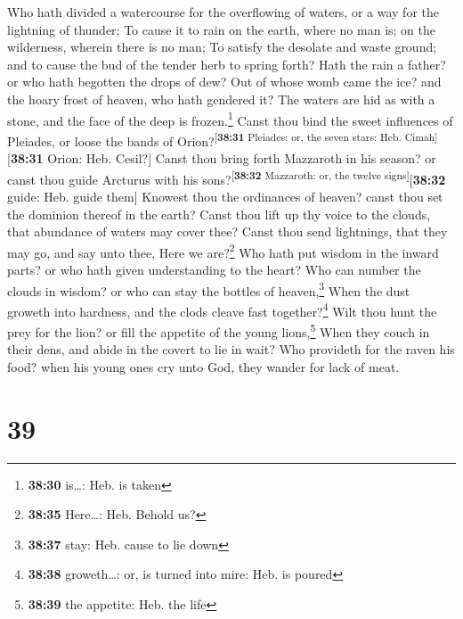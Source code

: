  Who hath divided a watercourse for the overflowing of
waters, or a way for the lightning of thunder;  To cause
it to rain on the earth, where no man is; on the wilderness, wherein
there is no man;  To satisfy the desolate and waste
ground; and to cause the bud of the tender herb to spring forth?
 Hath the rain a father? or who hath begotten the drops
of dew?  Out of whose womb came the ice? and the hoary
frost of heaven, who hath gendered it?  The waters are
hid as with a stone, and the face of the deep is frozen.\footnote{\textbf{38:30}
  is\ldots: Heb. is taken}  Canst thou bind the sweet
influences of Pleiades, or loose the bands of
Orion?\textsuperscript{{[}\textbf{38:31} Pleiades: or, the seven stars:
Heb. Cimah{]}}{[}\textbf{38:31} Orion: Heb. Cesil?{]} 
Canst thou bring forth Mazzaroth in his season? or canst thou guide
Arcturus with his sons?\textsuperscript{{[}\textbf{38:32} Mazzaroth: or,
the twelve signs{]}}{[}\textbf{38:32} guide: Heb. guide them{]}
 Knowest thou the ordinances of heaven? canst thou set
the dominion thereof in the earth?  Canst thou lift up
thy voice to the clouds, that abundance of waters may cover thee?
 Canst thou send lightnings, that they may go, and say
unto thee, Here we are?\footnote{\textbf{38:35} Here\ldots: Heb. Behold
  us?}  Who hath put wisdom in the inward parts? or who
hath given understanding to the heart?  Who can number
the clouds in wisdom? or who can stay the bottles of heaven,\footnote{\textbf{38:37}
  stay: Heb. cause to lie down}  When the dust groweth
into hardness, and the clods cleave fast together?\footnote{\textbf{38:38}
  groweth\ldots: or, is turned into mire: Heb. is poured}
 Wilt thou hunt the prey for the lion? or fill the
appetite of the young lions,\footnote{\textbf{38:39} the appetite: Heb.
  the life}  When they couch in their dens, and abide in
the covert to lie in wait?  Who provideth for the raven
his food? when his young ones cry unto God, they wander for lack of
meat.

\hypertarget{section-38}{%
\section{39}\label{section-38}}


